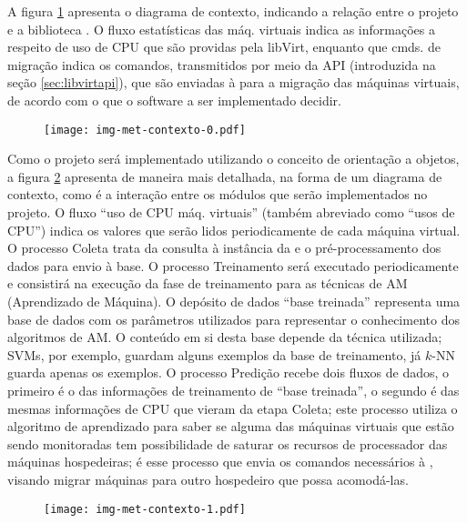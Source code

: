 A figura \ref{fig:contexto0} apresenta o diagrama de contexto,
indicando a relação entre o projeto e a biblioteca \libvirt{}. O fluxo
estatísticas das máq. virtuais indica as informações a respeito de uso de
CPU que são providas pela libVirt, enquanto que cmds. de migração indica os
comandos, transmitidos por meio da API (introduzida na seção
\ref{sec:libvirtapi}), que são enviadas à \libvirt{} para a migração das
máquinas virtuais, de acordo com o que o software a ser implementado
decidir.

\begin{figure}[htp]
\centering
\texttt{[image: img-met-contexto-0.pdf]}
\label{fig:contexto0}
\end{figure}

Como o projeto será implementado utilizando o conceito de orientação a
objetos, a figura \ref{fig:contexto1} apresenta
de maneira mais detalhada, na forma de um diagrama de contexto, como é a
interação entre os módulos que serão implementados no projeto. O fluxo
“uso de CPU máq. virtuais” (também abreviado como “usos de CPU”)
indica os valores que serão lidos periodicamente de cada máquina virtual.  O
processo Coleta trata da consulta à instância da \libvirt{} e o
pré-processamento dos dados para envio à base. O processo Treinamento
será executado periodicamente e consistirá na execução da fase de treinamento
para as técnicas de AM (Aprendizado de Máquina). O depósito de dados
``base treinada'' representa uma base de dados com os parâmetros
utilizados para representar o conhecimento dos algoritmos de AM. O conteúdo em
si desta base depende da técnica utilizada; SVMs, por exemplo, guardam alguns
exemplos da base de treinamento, já $k$-NN guarda apenas os
exemplos. O processo Predição recebe dois fluxos de dados, o primeiro
é o das informações de treinamento de ``base treinada'', o segundo é
das mesmas informações de CPU que vieram da etapa Coleta; este
processo utiliza o algoritmo de aprendizado para saber se alguma das máquinas
virtuais que estão sendo monitoradas tem possibilidade de saturar os recursos
de processador das máquinas hospedeiras; é esse processo que envia os comandos
necessários à \libvirt{}, visando migrar máquinas para outro hospedeiro que
possa acomodá-las.

\begin{figure}[htp]
\centering
\texttt{[image: img-met-contexto-1.pdf]}
\label{fig:contexto1}
\end{figure}

